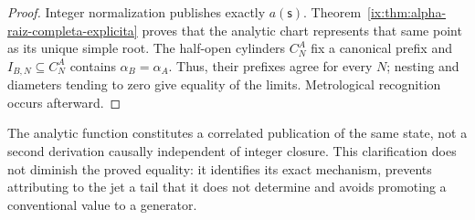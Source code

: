 \begin{proof}
Integer normalization publishes exactly \(a(\mathsf s)\).
Theorem~\ref{ix:thm:alpha-raiz-completa-explicita} proves that the analytic
chart represents that same point as its unique simple root. The
half-open cylinders \(C_N^A\) fix a canonical prefix and
\(I_{B,N}\subseteq C_N^A\) contains \(\alpha_B=\alpha_A\). Thus, their
prefixes agree for every \(N\); nesting and diameters tending to
zero give equality of the limits. Metrological
recognition occurs afterward.
\end{proof}

The analytic function constitutes a correlated publication of the same
state, not a second derivation causally independent of integer
closure. This clarification does not diminish the proved equality: it identifies its
exact mechanism, prevents attributing to the jet a tail that it does not determine and avoids
promoting a conventional value to a generator.


\endinput

\subsubsection{Complete reader, naturality, and common cylinders}

Let \(F_{\mathsf s}\) be the coefficient field of the signature of
\(\mathsf s\in\mathcal X_\alpha^{\mathrm{enr}}\), and let \(d_m=6+3m\).
Define
\[
 \mathfrak J_m:=\coprod_{\mathsf s\in\mathcal X_\alpha^{\mathrm{enr}}}
 \{\mathsf s\}\times F_{\mathsf s}[X]/(X^{d_m+1}),\qquad
 \Gamma_m(\mathsf s)=
 \bigl(\mathsf s,E_{21/22}^{(d_m)}(\mathsf s;X)\bigr).
\]
The registered complete reader \(\Gamma_{E21}\) produces these publications.
For \(m'\ge m\), the truncation
\(
 \tau_{m',m}(\mathsf s,[f]_{d_{m'}})
 =(\mathsf s,[f]_{d_m})
\)
satisfies
\begin{equation}
 \tau_{m',m}\circ\Gamma_{m'}=\Gamma_m,
 \qquad
 E_{21/22}:=\varprojlim_mE_{21/22}^{(d_m)}.
 \tag{A3}
 \label{ix:eq:alpha-sistema-analitico-completo}
\end{equation}
No section of the bare truncation is added. If publication
of the next three coefficients is made explicit, it is the derived
projection
\[
 \Lambda_{d_m+1:d_m+3}
 :=\operatorname{pr}_{d_m+1:d_m+3}\circ
   \Gamma_{E21}\circ\mathcal U_{\mathrm{TPK}},
\]
not an independent generator or a reading of the target value.

